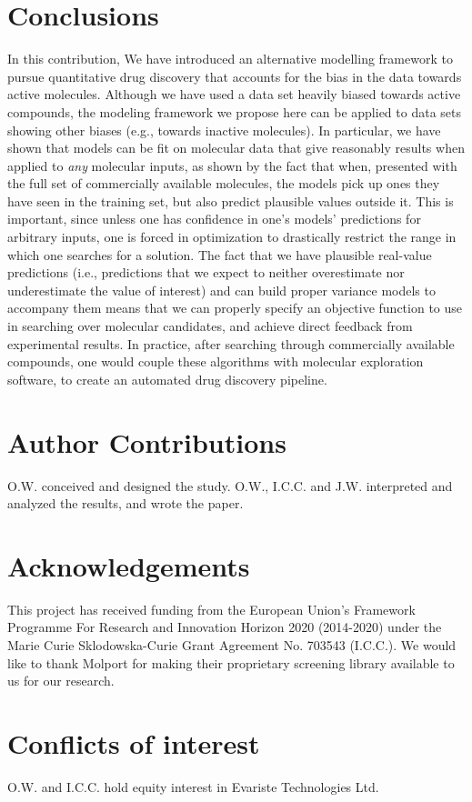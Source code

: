 \documentclass[journal=jacsat,manuscript=article]{achemso}
\begin{document}
\section*{Conclusions}
In this contribution, 
We have introduced an alternative modelling framework to pursue quantitative drug discovery that accounts for the bias in the data towards active molecules. Although we have used a data set heavily biased towards active compounds, the modeling framework we propose here can be applied to data sets showing other biases (e.g., towards inactive molecules).
In particular, we have shown that models can be fit on molecular data that give reasonably results when applied to \textit{any} molecular inputs, as shown by the fact that when, presented with the full set of commercially available molecules, the models pick up ones they have seen in the training set, but also predict plausible values outside it.  This is important, since unless one has confidence in one's models' predictions for arbitrary inputs, one is forced in optimization to drastically restrict the range in which one searches for a solution.   The fact that we have plausible real-value predictions (i.e., predictions that we expect to neither overestimate nor underestimate the value of interest) and can build proper variance models to accompany them means that we can properly specify an objective function to use in searching over molecular candidates, and achieve direct feedback from experimental results.  In practice, after searching through commercially available compounds, one would couple these algorithms with molecular exploration software\cite{Firth2015,Merk2018}, 
to create an automated drug discovery pipeline.  


\newpage
\section*{Author Contributions}
O.W. conceived and designed the study. 
O.W., I.C.C. and J.W. interpreted and analyzed the results, and wrote the paper.

\section*{Acknowledgements}
This project has received funding from the European Union’s Framework Programme For Research and Innovation Horizon 2020 (2014-2020) under the Marie Curie Sklodowska-Curie Grant Agreement No. 703543 (I.C.C.).
We would like to thank Molport for making their proprietary screening library available to us for our research.

\section*{Conflicts of interest}
O.W. and I.C.C. hold equity interest in Evariste Technologies Ltd.

\newpage

%

\end{document}
